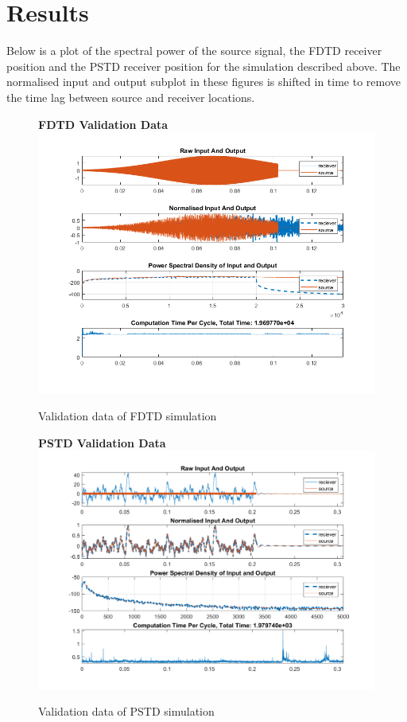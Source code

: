 \section{Results}
Below is a plot of the spectral power of the source signal, the FDTD receiver position and the PSTD receiver position for the simulation described above. The normalised input and output subplot in these figures is shifted in time to remove the time lag between source and receiver locations.

\begin{figure}[H]
\centering
\textbf{FDTD Validation Data}
  \includegraphics[width=\textwidth]{./graphics/FDTDvalidationFinal.png}
  \caption{Validation data of FDTD simulation}
\end{figure}

\begin{figure}[H]
\centering
\textbf{PSTD Validation Data}
  \includegraphics[width=\textwidth]{./graphics/PSTDvalidation10k.png}
  \caption{Validation data of PSTD simulation}
\end{figure}

